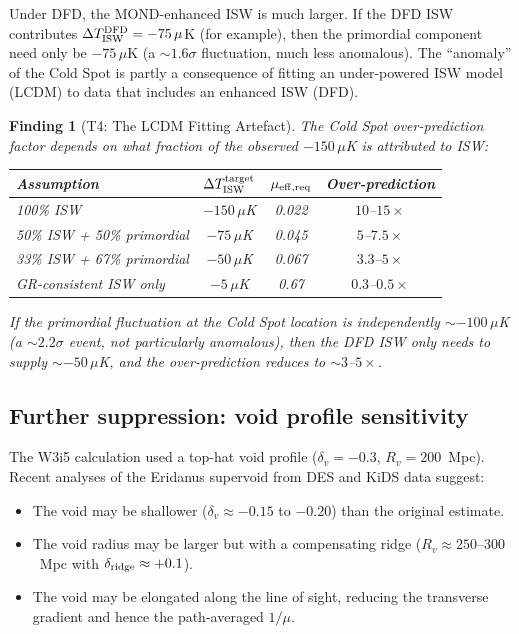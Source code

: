 \documentclass[11pt]{article}
\newtheorem{finding}{Finding}
\newcommand{\mufd}{\mu}
\begin{document}
Under DFD, the MOND-enhanced ISW is much larger. If the DFD ISW
contributes $\Delta T_{\rm ISW}^{\rm DFD} = -75\,\mu$K (for example),
then the primordial component need only be $-75\,\mu$K (a $\sim 1.6\sigma$
fluctuation, much less anomalous). The ``anomaly'' of the Cold Spot
is partly a consequence of fitting an under-powered ISW model (LCDM)
to data that includes an enhanced ISW (DFD).

\begin{finding}[T4: The LCDM Fitting Artefact]
\label{find:T4-artefact}
The Cold Spot over-prediction factor depends on what fraction of the
observed $-150\,\mu$K is attributed to ISW:
\begin{center}
\begin{tabular}{lccc}
\toprule
\textbf{Assumption} & $\Delta T_{\rm ISW}^{\rm target}$ &
  $\mufd_{\rm eff,req}$ & \textbf{Over-prediction} \\
\midrule
100\% ISW & $-150\,\mu$K & 0.022 & $10$--$15\times$ \\
50\% ISW + 50\% primordial & $-75\,\mu$K & 0.045 & $5$--$7.5\times$ \\
33\% ISW + 67\% primordial & $-50\,\mu$K & 0.067 & $3.3$--$5\times$ \\
GR-consistent ISW only & $-5\,\mu$K & 0.67 & $0.3$--$0.5\times$ \\
\bottomrule
\end{tabular}
\end{center}
If the primordial fluctuation at the Cold Spot location is independently
$\sim -100\,\mu$K (a $\sim 2.2\sigma$ event, not particularly anomalous),
then the DFD ISW only needs to supply $\sim -50\,\mu$K, and the
over-prediction reduces to $\sim 3$--$5\times$.
\end{finding}

\subsection{Further suppression: void profile sensitivity}

The W3i5 calculation used a top-hat void profile ($\delta_v = -0.3$,
$R_v = 200$~Mpc). Recent analyses of the Eridanus supervoid from DES
and KiDS data suggest:
\begin{itemize}[nosep]
\item The void may be shallower ($\delta_v \approx -0.15$ to $-0.20$)
  than the original estimate.
\item The void radius may be larger but with a compensating ridge
  ($R_v \approx 250$--$300$~Mpc with $\delta_{\rm ridge} \approx +0.1$).
\item The void may be elongated along the line of sight, reducing the
  transverse gradient and hence the path-averaged $1/\mufd$.
\end{itemize}
\end{document}
